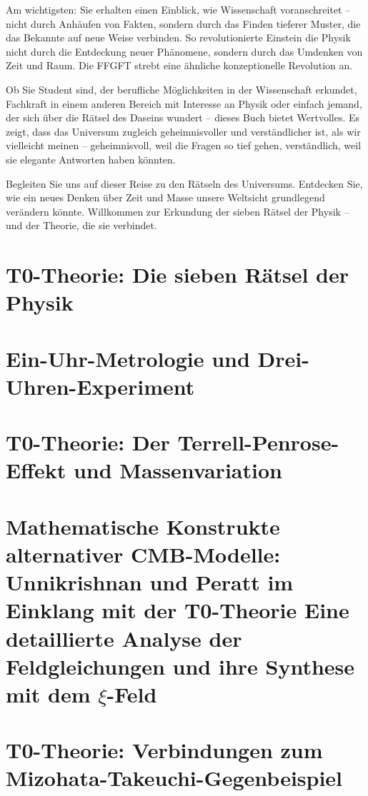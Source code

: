 \documentclass[11pt,openright,twoside]{book}
\begin{document}
Am wichtigsten: Sie erhalten einen Einblick, wie Wissenschaft voranschreitet – nicht durch Anhäufen von Fakten, sondern durch das Finden tieferer Muster, die das Bekannte auf neue Weise verbinden. So revolutionierte Einstein die Physik nicht durch die Entdeckung neuer Phänomene, sondern durch das Umdenken von Zeit und Raum. Die FFGFT strebt eine ähnliche konzeptionelle Revolution an.

Ob Sie Student sind, der berufliche Möglichkeiten in der Wissenschaft erkundet, Fachkraft in einem anderen Bereich mit Interesse an Physik oder einfach jemand, der sich über die Rätsel des Daseins wundert – dieses Buch bietet Wertvolles. Es zeigt, dass das Universum zugleich geheimnisvoller und verständlicher ist, als wir vielleicht meinen – geheimnisvoll, weil die Fragen so tief gehen, verständlich, weil sie elegante Antworten haben könnten.

Begleiten Sie uns auf dieser Reise zu den Rätseln des Universums. Entdecken Sie, wie ein neues Denken über Zeit und Masse unsere Weltsicht grundlegend verändern könnte. Willkommen zur Erkundung der sieben Rätsel der Physik – und der Theorie, die sie verbindet.


\chapter{T0-Theorie: Die sieben Rätsel der Physik}


\chapter{Ein-Uhr-Metrologie und Drei-Uhren-Experiment}


\chapter{T0-Theorie: Der Terrell-Penrose-Effekt und Massenvariation}

\chapter{Mathematische Konstrukte alternativer CMB-Modelle: Unnikrishnan und Peratt im Einklang mit der T0-Theorie Eine detaillierte Analyse der Feldgleichungen und ihre Synthese mit dem $\xi$-Feld}


\chapter{T0-Theorie: Verbindungen zum Mizohata-Takeuchi-Gegenbeispiel}

\end{document}
